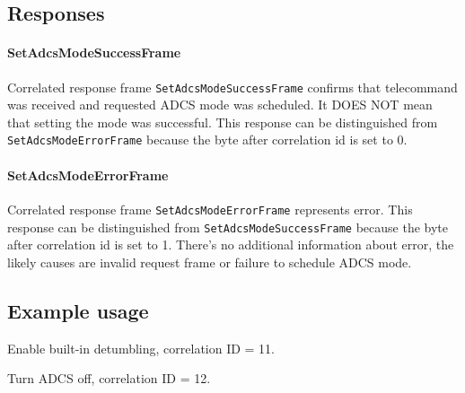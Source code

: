 \subsection{Responses}

\paragraph{SetAdcsModeSuccessFrame}
Correlated response frame \texttt{SetAdcsModeSuccessFrame} confirms that telecommand was received and requested ADCS mode was scheduled.  It DOES NOT mean that setting the mode was successful. This response can be distinguished from \texttt{SetAdcsModeErrorFrame} because the byte after correlation id is set to 0. 

\paragraph{SetAdcsModeErrorFrame}
Correlated response frame \texttt{SetAdcsModeErrorFrame} represents error. This response can be distinguished from \texttt{SetAdcsModeSuccessFrame} because the byte after correlation id is set to 1. There's no additional information about error, the likely causes are invalid request frame or failure to schedule ADCS mode.

\subsection{Example usage}
Enable built-in detumbling, correlation ID = 11.


Turn ADCS off, correlation ID = 12.

